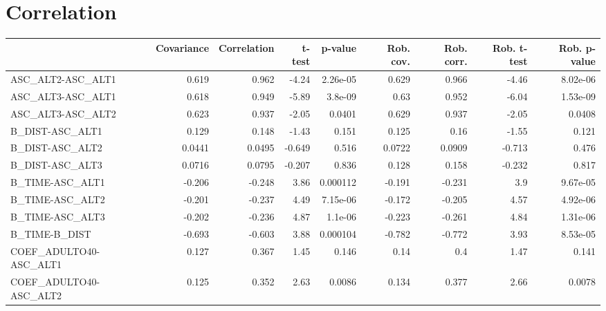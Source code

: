 \section{Correlation}
\begin{tabular}{lrrrrrrrr}
\toprule
{} &  Covariance &  Correlation &   t-test &  p-value &  Rob. cov. &  Rob. corr. &  Rob. t-test &  Rob. p-value \\
\midrule
ASC\_ALT2-ASC\_ALT1                 &       0.619 &        0.962 &    -4.24 & 2.26e-05 &      0.629 &       0.966 &        -4.46 &      8.02e-06 \\
ASC\_ALT3-ASC\_ALT1                 &       0.618 &        0.949 &    -5.89 &  3.8e-09 &       0.63 &       0.952 &        -6.04 &      1.53e-09 \\
ASC\_ALT3-ASC\_ALT2                 &       0.623 &        0.937 &    -2.05 &   0.0401 &      0.629 &       0.937 &        -2.05 &        0.0408 \\
B\_DIST-ASC\_ALT1                   &       0.129 &        0.148 &    -1.43 &    0.151 &      0.125 &        0.16 &        -1.55 &         0.121 \\
B\_DIST-ASC\_ALT2                   &      0.0441 &       0.0495 &   -0.649 &    0.516 &     0.0722 &      0.0909 &       -0.713 &         0.476 \\
B\_DIST-ASC\_ALT3                   &      0.0716 &       0.0795 &   -0.207 &    0.836 &      0.128 &       0.158 &       -0.232 &         0.817 \\
B\_TIME-ASC\_ALT1                   &      -0.206 &       -0.248 &     3.86 & 0.000112 &     -0.191 &      -0.231 &          3.9 &      9.67e-05 \\
B\_TIME-ASC\_ALT2                   &      -0.201 &       -0.237 &     4.49 & 7.15e-06 &     -0.172 &      -0.205 &         4.57 &      4.92e-06 \\
B\_TIME-ASC\_ALT3                   &      -0.202 &       -0.236 &     4.87 &  1.1e-06 &     -0.223 &      -0.261 &         4.84 &      1.31e-06 \\
B\_TIME-B\_DIST                     &      -0.693 &       -0.603 &     3.88 & 0.000104 &     -0.782 &      -0.772 &         3.93 &      8.53e-05 \\
COEF\_ADULTO40-ASC\_ALT1            &       0.127 &        0.367 &     1.45 &    0.146 &       0.14 &         0.4 &         1.47 &         0.141 \\
COEF\_ADULTO40-ASC\_ALT2            &       0.125 &        0.352 &     2.63 &   0.0086 &      0.134 &       0.377 &         2.66 &        0.0078 \\

\end{tabular}
